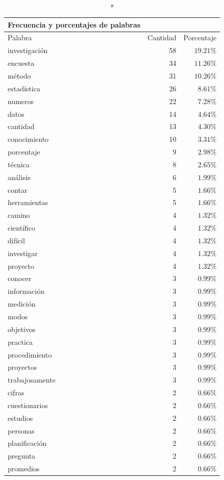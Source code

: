 \documentclass[
  letterpaper,
  DIV=11,
  numbers=noendperiod]{scrreprt}
\begin{document}
\begin{longtable}{lrr}
\caption*{
{\large Frecuencia y porcentajes de palabras}
} \\ 
\toprule
Palabra & Cantidad & Porcentaje \\ 
\midrule
investigación & 58 & $19.21\%$ \\ 
encuesta & 34 & $11.26\%$ \\ 
método & 31 & $10.26\%$ \\ 
estadística & 26 & $8.61\%$ \\ 
numeros & 22 & $7.28\%$ \\ 
datos & 14 & $4.64\%$ \\ 
cantidad & 13 & $4.30\%$ \\ 
conocimiento & 10 & $3.31\%$ \\ 
porcentaje & 9 & $2.98\%$ \\ 
técnica & 8 & $2.65\%$ \\ 
análisis & 6 & $1.99\%$ \\ 
contar & 5 & $1.66\%$ \\ 
herramientas & 5 & $1.66\%$ \\ 
camino & 4 & $1.32\%$ \\ 
científico & 4 & $1.32\%$ \\ 
difícil & 4 & $1.32\%$ \\ 
investigar & 4 & $1.32\%$ \\ 
proyecto & 4 & $1.32\%$ \\ 
conocer & 3 & $0.99\%$ \\ 
información & 3 & $0.99\%$ \\ 
medición & 3 & $0.99\%$ \\ 
modos & 3 & $0.99\%$ \\ 
objetivos & 3 & $0.99\%$ \\ 
practica & 3 & $0.99\%$ \\ 
procedimiento & 3 & $0.99\%$ \\ 
proyectos & 3 & $0.99\%$ \\ 
trabajosamente & 3 & $0.99\%$ \\ 
cifras & 2 & $0.66\%$ \\ 
cuestionarios & 2 & $0.66\%$ \\ 
estudios & 2 & $0.66\%$ \\ 
personas & 2 & $0.66\%$ \\ 
planificación & 2 & $0.66\%$ \\ 
pregunta & 2 & $0.66\%$ \\ 
promedios & 2 & $0.66\%$ \\ 
\bottomrule
\end{longtable}
\end{document}
